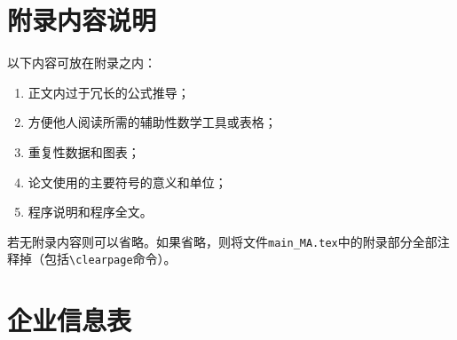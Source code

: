 
\begin{appendices}

\section{附录内容说明}

以下内容可放在附录之内：
\begin{enumerate}[label=(\arabic*)]
  \item{正文内过于冗长的公式推导；}
  \item{方便他人阅读所需的辅助性数学工具或表格；}
  \item{重复性数据和图表；}
  \item{论文使用的主要符号的意义和单位；}
  \item{程序说明和程序全文。}
\end{enumerate}

若无附录内容则可以省略。如果省略，则将文件\verb|main_MA.tex|中的附录部分全部注释掉（包括\verb|\clearpage|命令）。


\section{企业信息表}


\end{appendices}
